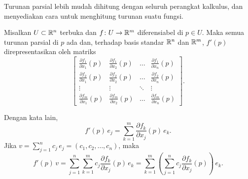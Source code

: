 Turunan parsial lebih mudah dihitung dengan seluruh perangkat
kalkulus, dan menyediakan cara untuk menghitung turunan suatu
fungsi.

\begin{prop} \label{mv:prop:jacobianmatrix}
Misalkan $U \subset {\mathbb{R}}^n$ terbuka dan $f \colon U \to {\mathbb{R}}^m$
diferensiabel di $p \in U$.  Maka semua turunan parsial di $p$
ada dan, terhadap basis standar ${\mathbb{R}}^n$ dan ${\mathbb{R}}^m$,
$f'(p)$ direpresentasikan oleh matriks
\begin{equation*}
\begin{bmatrix}
\frac{\partial f_1}{\partial x_1}(p)
&
\frac{\partial f_1}{\partial x_2}(p)
& \ldots &
\frac{\partial f_1}{\partial x_n}(p)
\\[6pt]
\frac{\partial f_2}{\partial x_1}(p)
&
\frac{\partial f_2}{\partial x_2}(p)
& \ldots &
\frac{\partial f_2}{\partial x_n}(p)
\\
\vdots & \vdots & \ddots & \vdots
\\
\frac{\partial f_m}{\partial x_1}(p)
&
\frac{\partial f_m}{\partial x_2}(p)
& \ldots &
\frac{\partial f_m}{\partial x_n}(p)
\end{bmatrix} .
\end{equation*}
\end{prop}


Dengan kata lain,
\begin{equation*}
f'(p) \, e_j =
\sum_{k=1}^m
\frac{\partial f_k}{\partial x_j}(p) \,e_k .
\end{equation*}
Jika $v = \sum_{j=1}^n c_j\, e_j = (c_1,c_2,\ldots,c_n)$, maka
\begin{equation*}
f'(p) \, v =
\sum_{j=1}^n
\sum_{k=1}^m
 c_j
\frac{\partial f_k}{\partial x_j}(p) \,e_k
=
\sum_{k=1}^m
\left(
\sum_{j=1}^n
 c_j
\frac{\partial f_k}{\partial x_j}(p) \right) \,e_k .
\end{equation*}

